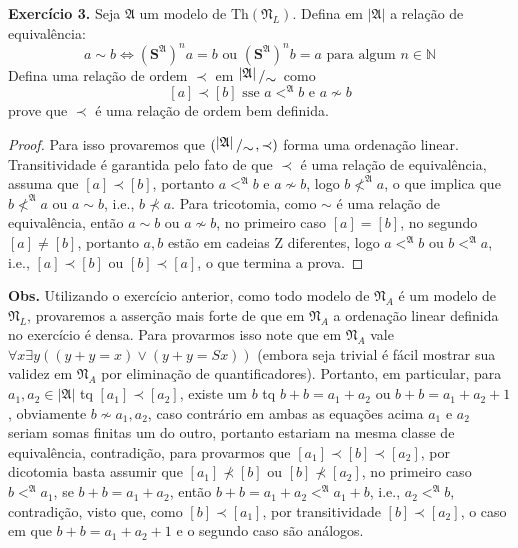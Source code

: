 \documentclass[11pt]{article}
\newcommand{\mf}[1]{\mathfrak{#1}}
\newcommand{\mbb}[1]{\mathbb{#1}}
\newcommand{\bigslant}[2]{{\raisebox{.2em}{$#1$}\left/\raisebox{-.2em}{$#2$}\right.}}
\begin{document}
\begin{shaded}
\textbf{Exercício 3.} Seja $\mf{A}$ um modelo de $\text{Th}(\mf{N}_L)$. Defina em $|\mf{A}|$ a relação de equivalência:
$$a\sim b\Leftrightarrow(\mathbf{S}^\mf{A})^na=b\text{ ou }(\mathbf{S}^\mf{A})^nb=a\text{ para algum }n\in\mbb{N}$$
Defina uma relação de ordem $\prec$ em $\bigslant{|\mf{A}|}{\sim}$ como
$$[a]\prec[b]\text{ sse }a<^\mf{A}b\text{ e }a\nsim b$$
prove que $\prec$ é uma relação de ordem bem definida.
\end{shaded}

\begin{proof}
    Para isso provaremos que $(\bigslant{|\mf{A}|}{\sim},\prec)$ forma uma ordenação linear. Transitividade é garantida pelo fato de que $\prec$ é uma relação de equivalência, assuma que $[a]\prec[b]$, portanto $a<^\mf{A}b$ e $a\nsim b$, logo $b\nless^\mf{A}a$, o que implica que $b\nless^\mf{A}a$ ou $a\sim b$, i.e., $b\nprec a$. Para tricotomia, como $\sim$ é uma relação de equivalência, então $a\sim b$ ou $a\nsim b$, no primeiro caso $[a]=[b]$, no segundo $[a]\neq[b]$, portanto $a,b$ estão em cadeias Z diferentes, logo $a<^\mf{A}b$ ou $b<^\mf{A}a$, i.e., $[a]\prec[b]$ ou $[b]\prec[a]$, o que termina a prova.
\end{proof}

\begin{shaded}
\textbf{Obs.} Utilizando o exercício anterior, como todo modelo de $\mf{N}_A$ é um modelo de $\mf{N}_L$, provaremos a asserção mais forte de que em $\mf{N}_A$ a ordenação linear definida no exercício é densa. Para provarmos isso note que em $\mf{N}_A$ vale $\forall x\exists y((y+y=x)\vee (y+y=Sx))$ (embora seja trivial é fácil mostrar sua validez em $\mf{N}_A$ por eliminação de quantificadores). Portanto, em particular, para $a_1,a_2\in|\mf{A}|$ tq $[a_1]\prec[a_2]$, existe um $b$ tq $b+b=a_1+a_2$ ou $b+b=a_1+a_2+1$, obviamente $b\nsim a_1,a_2$, caso contrário em ambas as equações acima $a_1$ e $a_2$ seriam somas finitas um do outro, portanto estariam na mesma classe de equivalência, contradição, para provarmos que $[a_1]\prec [b]\prec [a_2]$, por dicotomia basta assumir que $[a_1]\nprec[b]$ ou $[b]\nprec[a_2]$, no primeiro caso $b<^\mf{A}a_1$, se $b+b=a_1+a_2$, então $b+b=a_1+a_2<^\mf{A}a_1+b$, i.e., $a_2<^\mf{A}b$, contradição, visto que, como $[b]\prec[a_1]$, por transitividade $[b]\prec[a_2]$, o caso em que $b+b=a_1+a_2+1$ e o segundo caso são análogos.

\end{shaded}
\end{document}
